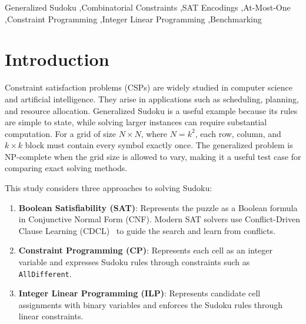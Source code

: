 \documentclass[a4paper,fleqn]{cas-sc}
\begin{document}
\begin{keywords}
Generalized Sudoku \sep Combinatorial Constraints \sep SAT Encodings \sep At-Most-One \sep Constraint Programming \sep Integer Linear Programming \sep Benchmarking
\end{keywords}

\maketitle

\section{Introduction}
\label{sec:intro}

Constraint satisfaction problems (CSPs) are widely studied in computer science and artificial intelligence. They arise in applications such as scheduling, planning, and resource allocation. Generalized Sudoku is a useful example because its rules are simple to state, while solving larger instances can require substantial computation. For a grid of size $N \times N$, where $N = k^2$, each row, column, and $k \times k$ block must contain every symbol exactly once. The generalized problem is NP-complete when the grid size is allowed to vary, making it a useful test case for comparing exact solving methods.

This study considers three approaches to solving Sudoku:

\begin{enumerate}
    \item \textbf{Boolean Satisfiability (SAT)}: Represents the puzzle as a Boolean formula in Conjunctive Normal Form (CNF). Modern SAT solvers use Conflict-Driven Clause Learning (CDCL)~\cite{SAT_book} to guide the search and learn from conflicts.

    \item \textbf{Constraint Programming (CP)}: Represents each cell as an integer variable and expresses Sudoku rules through constraints such as \texttt{AllDifferent}.

    \item \textbf{Integer Linear Programming (ILP)}: Represents candidate cell assignments with binary variables and enforces the Sudoku rules through linear constraints.
\end{enumerate}
\end{document}
